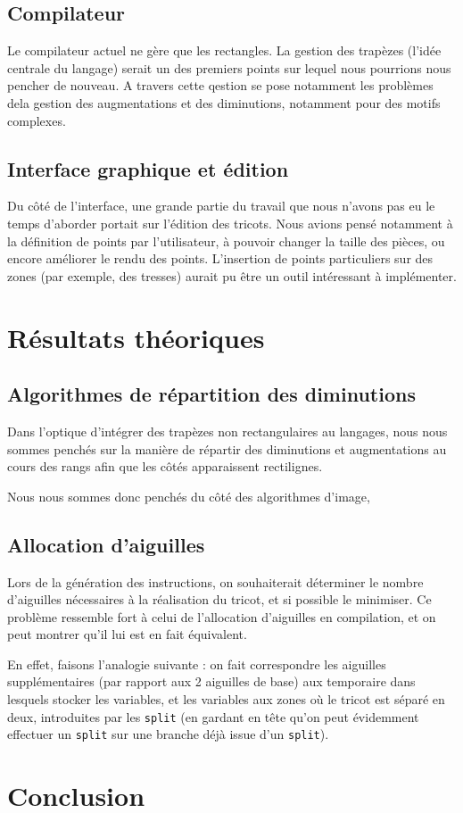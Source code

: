 \documentclass{article}
\begin{document}
\subsection{Compilateur}

Le compilateur actuel ne gère que les rectangles. La gestion des trapèzes 
(l'idée centrale du langage) serait un des premiers points sur lequel nous
pourrions nous pencher de nouveau. A travers cette qestion se pose notamment
les problèmes dela gestion des augmentations et des diminutions, notamment pour
des motifs complexes.

\subsection{Interface graphique et édition}

Du côté de l'interface, une grande partie du travail que nous n'avons
pas eu le temps d'aborder portait sur l'édition des tricots. Nous
avions pensé notamment à la définition de points par l'utilisateur, à
pouvoir changer la taille des pièces, ou encore améliorer le rendu des
points. L'insertion de points particuliers sur des zones (par exemple,
des tresses) aurait pu être un outil intéressant à implémenter.

\section{Résultats théoriques}

\subsection{Algorithmes de répartition des diminutions}

Dans l'optique d'intégrer des trapèzes non rectangulaires au langages, nous nous sommes penchés sur la manière de répartir des 
diminutions et augmentations au cours des rangs afin que les côtés apparaissent rectilignes.

Nous nous sommes donc penchés du côté des algorithmes d'image, 

\subsection{Allocation d'aiguilles}

Lors de la génération des instructions, on souhaiterait déterminer le nombre d'aiguilles nécessaires à la réalisation du tricot, 
et si possible le minimiser. Ce problème ressemble fort à celui de l'allocation d'aiguilles en compilation, et on peut montrer 
qu'il lui est en fait équivalent.

En effet, faisons l'analogie suivante : on fait correspondre les aiguilles supplémentaires (par rapport aux 2 aiguilles de base) 
aux temporaire dans lesquels stocker les variables, et les variables aux zones où le tricot est séparé en deux, introduites par 
les \texttt{split} (en gardant en tête qu'on peut évidemment effectuer un \texttt{split} sur une branche déjà issue d'un \texttt{split}).

\section*{Conclusion}
\end{document}

